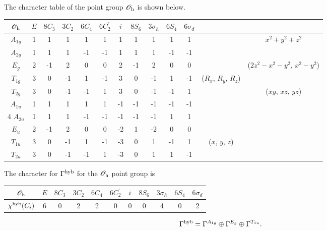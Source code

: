 \documentclass[a4paper]{book}
\begin{document}
\begin{solution}
		The character table of the point group $\mathscr{O}_{\rm h}$ is shown below.		
		\begin{center}
		\begin{tabular}{ccccccccccccc}\hline
	$\mathscr{O}_{\rm h}$ & $E$ & $8C_3$ &	$3C_2$	& $6C_4$	&	$6C^\prime_2$	&	$i$	&	$8S_6$	&	$3\sigma_{h}$	&	$6S_4$ &	$6\sigma_{d}$	&	&\\ \hline
			$A_{1g}$	&	1	&	1	&	1	&	1	&	1	&	1	&	1	&	1	&	1	&	1	&		&	$x^2+y^2+z^2$\\
			$A_{2g}$	&	1	&	1	&	1	&	-1	&	-1	&	1	&	1	&	1	&	-1	&	-1	& 		&	\\
			$E_g$ 		&	2	&	-1	&	2	&	0	&	0	&	2	&	-1	&	2	&	0	&	0	& 		& ($2z^2-x^2-y^2$, $x^2-y^2$)\\
			$T_{1g}$	&	3	&	0	&	-1	&	1	&	-1	&	3	&	0	&	-1	&	1	&	-1	& ($R_x$, $R_y$, $R_z$)	&	\\
			$T_{2g}$ 	&	3	&	0	&	-1	&	-1	&	1	&	3	&	0	&	-1	&	-1	&	1	&		& ($xy$, $xz$, $yz$)\\
			$A_{1u}$	&	1	&	1	&	1	&	1	&	1	&	-1	&	-1	&	-1	&	-1	&	-1	&		&	\\4
			$A_{2u}$	&	1	&	1	&	1	&	-1	&	-1	&	-1	&	-1	&	-1	&	1	&	1	&		&	\\
			$E_u$ 		&	2	&	-1	&	2	&	0	&	0	&	-2	&	1	&	-2	&	0	&	0	& 		& \\ 
			$T_{1u}$	&	3	&	0	&	-1	&	1	&	-1	&	-3	&	0	&	1	&	-1	&	1	& ($x$, $y$, $z$)	&	\\
			$T_{2u}$ 	&	3	&	0	&	-1	&	-1	&	1	&	-3	&	0	&	1	&	1	&	-1	&		&	\\	\hline
		\end{tabular}
		\end{center}
		
		The character for $\Gamma^{\rm hyb}$ for the $\mathscr{O}_{\rm h}$ point group is 
		\begin{center}
		\begin{tabular}{ccccccccccc}\hline
	$\mathscr{O}_{\rm h}$ & $E$ & $8C_3$ &	$3C_2$	& $6C_4$	&	$6C^\prime_2$	&	$i$	&	$8S_6$	&	$3\sigma_{h}$	&	$6S_4$ &	$6\sigma_{d}$	\\ \hline
	$\chi^{\rm hyb}(C_i)$ & 6 & 0 & 2 & 2 & 0 &	0 & 0 & 4 & 0 & 2 \\ \hline
		\end{tabular}
		\end{center}
		
		\begin{equation*}
			\Gamma^{\rm hyb} = \Gamma^{A_{1g}} \oplus \Gamma^{E_g} \oplus \Gamma^{T_{1u}}.
		\end{equation*}
		

\end{solution}
\end{document}
